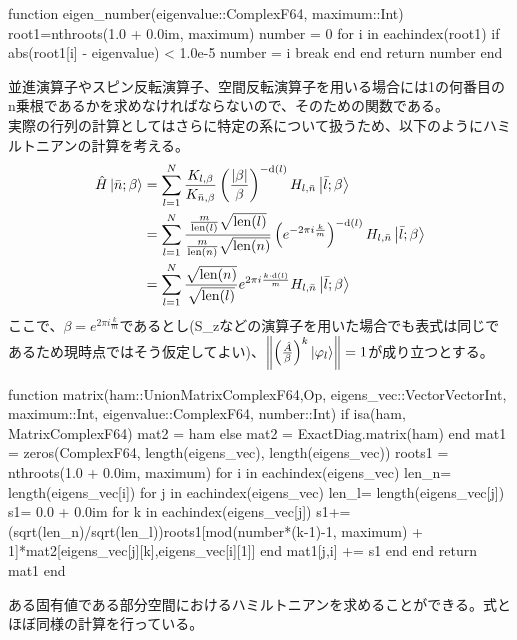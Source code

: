 \documentclass{ltjsarticle}
\begin{document}
\begin{jllisting}
function eigen_number(eigenvalue::ComplexF64, maximum::Int)
  root1=nthroots(1.0 + 0.0im, maximum)
  number = 0
  for i in eachindex(root1)
    if abs(root1[i] - eigenvalue) < 1.0e-5
      number = i
      break
    end
  end
  return number
end
\end{jllisting}
並進演算子やスピン反転演算子、空間反転演算子を用いる場合には1の何番目のn乗根であるかを求めなければならないので、そのための関数である。\\
実際の行列の計算としてはさらに特定の系について扱うため、以下のようにハミルトニアンの計算を考える。
\begin{align}
  \hat{H}\ket{\bar{n};\beta} &= \sum_{l=1}^{N}\frac{K_{l,\beta}}{K_{\bar{n},\beta}}\left(\frac{\abs{\beta}}{\beta}\right)^{-\mathrm{d}(l)} H_{l,\bar{n}}\ket{\bar{l};\beta}\\
  &=\sum_{l=1}^{N}\frac{\frac{m}{\mathrm{len}(l)}\sqrt{\mathrm{len}(l)}}{\frac{m}{\mathrm{len}(n)}\sqrt{\mathrm{len}(n)}}\left(e^{-2\pi i\frac{k}{m}}\right)^{-\mathrm{d}(l)} H_{l,\bar{n}}\ket{\bar{l};\beta}\\
  &=\sum_{l=1}^{N}\frac{\sqrt{\mathrm{len}(n)}}{\sqrt{\mathrm{len}(l)}}e^{2\pi i\frac{k\cdot \mathrm{d}(l)}{m}}H_{l,\bar{n}}\ket{\bar{l};\beta}
\end{align}
ここで、$\beta=e^{2\pi i\frac{k}{m}}$であるとし(S\_zなどの演算子を用いた場合でも表式は同じであるため現時点ではそう仮定してよい)、$\norm{\left(\frac{\hat{A}}{\beta} \right)^k \ket{\varphi_{l}}}=1$が成り立つとする。
\begin{jllisting}
function matrix(ham::Union{Matrix{ComplexF64},Op}, eigens_vec::Vector{Vector{Int}}, maximum::Int, eigenvalue::ComplexF64, number::Int)
  if isa(ham, Matrix{ComplexF64})
    mat2 = ham
  else
    mat2 = ExactDiag.matrix(ham)
  end
  mat1 = zeros(ComplexF64, length(eigens_vec), length(eigens_vec))
  roots1 = nthroots(1.0 + 0.0im, maximum)
  for i in eachindex(eigens_vec)
    len_n= length(eigens_vec[i])
    for j in eachindex(eigens_vec)
      len_l= length(eigens_vec[j])
      s1= 0.0 + 0.0im
      for k in eachindex(eigens_vec[j])
        s1+=(sqrt(len_n)/sqrt(len_l))roots1[mod(number*(k-1)-1, maximum) + 1]*mat2[eigens_vec[j][k],eigens_vec[i][1]]
      end
      mat1[j,i] += s1
    end
  end
  return mat1
end
\end{jllisting}
ある固有値である部分空間におけるハミルトニアンを求めることができる。式とほぼ同様の計算を行っている。
\end{document}
